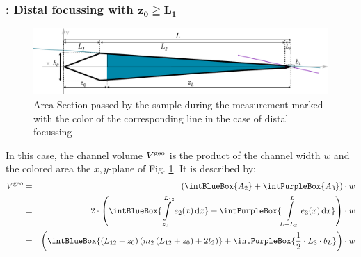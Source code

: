 \subsubsection*{\Vgeo: Distal focussing with $\bm{z_0 \geqq L_1}$}
\begin{figure}[h]
  \begin{center}
    \includegraphics[width=\linewidth]{./images/fffVolume1.pdf}
    \vspace*{-3ex}    
  \end{center}
  \caption[Passed area section - distal focussing]{Area Section passed by the sample during the measurement marked with 
  the color of the corresponding line in the case of distal focussing}
  \label{fig:fffVolume1} 
\end{figure}
In this case, the channel volume $V^\text{geo}$ is the product of the channel width $w$ and the colored area the
$x,y$-plane of Fig. \ref{fig:fffVolume1}.
It is described by:
\begin{align}
  \Vgeo & = &\left(\intBlueBox{\ensuremath{A_2}} + \intPurpleBox{\ensuremath{A_3}}\right) \cdot w \nonumber\\  
        & =&2 \cdot \left( 
             \intBlueBox {\ensuremath{ \int\limits_{z_0}^{L_{12}} e_2(x) \diff x }}
             + \intPurpleBox{\ensuremath{  \int\limits_{L-L_3}^{L} e_3(x) \diff x }}    
             \right) \cdot w  \nonumber \\
        &  =&\left(
              \intBlueBox{\ensuremath{ \left( L_{12}-z_0 \right)  \left( m_2 \left(L_{12}+z_0  \right) + 2 t_2  
              \right)  
              }}
              + \intPurpleBox{\ensuremath{ \frac{1}{2} \cdot L_3 \cdot \bL  } }
              \right) \cdot w
\end{align}

